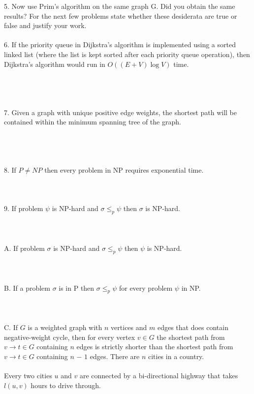\documentclass[12pt]{article}
\begin{document}
5. Now use Prim's algorithm on the same graph G. Did you obtain the same results?
\newpage
\noindent For the next few problems state whether these desiderata are true or false and justify your work.\\\\
6. If the priority queue in Dijkstra’s algorithm is 
implemented using a sorted linked list
(where the list is kept sorted after 
each priority queue operation), then 
Dijkstra’s algorithm
would run in $O((E+V)\log{V} )$ time.\\\\\\\\\\
7. Given a graph with unique positive edge weights, the shortest path will be contained within the minimum 
spanning tree of the graph.\\\\\\\\\\
8. If $P \ne NP$ then every problem in NP requires exponential time.\\\\\\\\
9. If problem $\psi$ is NP-hard and $\sigma \le_p \psi$ then $\sigma$ is NP-hard.\\\\\\\\
A. If problem $\sigma$ is NP-hard and $\sigma \le_p \psi$ then $\psi$ is NP-hard.\\\\\\\\
B. If a problem $\sigma$ is in P then $\sigma \le_p \psi$ for every problem $\psi$ in NP.\\\\\\\\
C. If $G$ is a weighted graph with $n$ vertices and $m$ edges that does contain negative-weight
cycle, then for every vertex $v \in G$ the shortest path from $v \rightarrow t \in G$ containing $n$ edges
is strictly shorter than the shortest path from $v \rightarrow t \in G$ containing $n$ $-$ $1$ edges.
\newpage
\noindent There are $n$ cities in a country.\\\\
Every two cities $u$ and $v$ are connected by a bi-directional highway that takes $l(u,v)$ hours to drive through.\\\\
\end{document}

